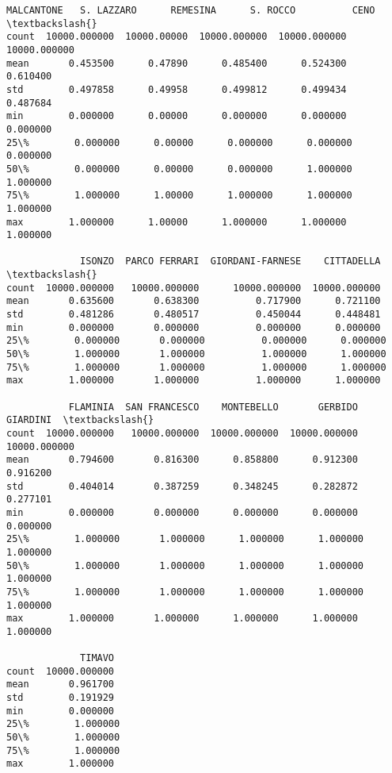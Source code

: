 \documentclass[11pt]{article}
\begin{document}
\begin{tcolorbox}[breakable, size=fbox, boxrule=.5pt, pad at break*=1mm, opacityfill=0]
\begin{Verbatim}[commandchars=\\\{\}]
         MALCANTONE   S. LAZZARO      REMESINA      S. ROCCO          CENO  \textbackslash{}
count  10000.000000  10000.00000  10000.000000  10000.000000  10000.000000
mean       0.453500      0.47890      0.485400      0.524300      0.610400
std        0.497858      0.49958      0.499812      0.499434      0.487684
min        0.000000      0.00000      0.000000      0.000000      0.000000
25\%        0.000000      0.00000      0.000000      0.000000      0.000000
50\%        0.000000      0.00000      0.000000      1.000000      1.000000
75\%        1.000000      1.00000      1.000000      1.000000      1.000000
max        1.000000      1.00000      1.000000      1.000000      1.000000

             ISONZO  PARCO FERRARI  GIORDANI-FARNESE    CITTADELLA  \textbackslash{}
count  10000.000000   10000.000000      10000.000000  10000.000000
mean       0.635600       0.638300          0.717900      0.721100
std        0.481286       0.480517          0.450044      0.448481
min        0.000000       0.000000          0.000000      0.000000
25\%        0.000000       0.000000          0.000000      0.000000
50\%        1.000000       1.000000          1.000000      1.000000
75\%        1.000000       1.000000          1.000000      1.000000
max        1.000000       1.000000          1.000000      1.000000

           FLAMINIA  SAN FRANCESCO    MONTEBELLO       GERBIDO      GIARDINI  \textbackslash{}
count  10000.000000   10000.000000  10000.000000  10000.000000  10000.000000
mean       0.794600       0.816300      0.858800      0.912300      0.916200
std        0.404014       0.387259      0.348245      0.282872      0.277101
min        0.000000       0.000000      0.000000      0.000000      0.000000
25\%        1.000000       1.000000      1.000000      1.000000      1.000000
50\%        1.000000       1.000000      1.000000      1.000000      1.000000
75\%        1.000000       1.000000      1.000000      1.000000      1.000000
max        1.000000       1.000000      1.000000      1.000000      1.000000

             TIMAVO
count  10000.000000
mean       0.961700
std        0.191929
min        0.000000
25\%        1.000000
50\%        1.000000
75\%        1.000000
max        1.000000
\end{Verbatim}
\end{tcolorbox}
        
\end{document}
